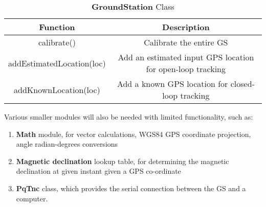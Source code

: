 \begin{table}[!htb]
  \centering
  \renewcommand{\arraystretch}{1.2}
  \begin{tabular}{ |c|c| }
  \hline
  \textbf{Function}             & \textbf{Description}    \\
  \hline
    calibrate()                 & Calibrate the entire GS \\
    addEstimatedLocation(loc)      & Add an estimated input GPS location for open-loop tracking \\
    addKnownLocation(loc)          & Add a known GPS location for closed-loop tracking \\
  \hline
  \end{tabular}
  \caption{\textbf{GroundStation} Class}
  \label{tab:groundStationUML}
\end{table}

\newpage
Various smaller modules will also be needed with limited functionality, such as:
\begin{enumerate}
    \item \textbf{Math} module, for vector calculations, WGS84 GPS coordinate projection, angle radian-degrees conversions
    \item \textbf{Magnetic declination} lookup table, for determining the magnetic declination at given instant given a GPS co-ordinate
    \item \textbf{PqTnc} class, which provides the serial connection between the GS and a computer.
\end{enumerate}